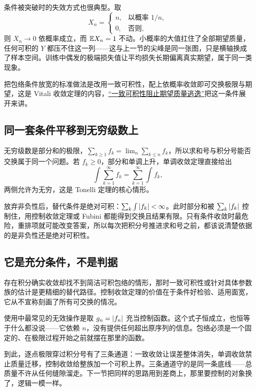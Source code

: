 条件被突破时的失效方式也很典型。取
\[
X_n=\begin{cases}
n,&\text{以概率 }1/n,\\
0,&\text{否则},
\end{cases}
\]
则 \(X_n\to0\) 依概率成立，而 \(\mathbb{E} X_n=1\) 不动。小概率的大值扛住了全部期望质量，任何可积的 \(Y\) 都压不住这一列——这与上一节的尖峰是同一张图，只是横轴换成了样本空间。训练中偶发的极端损失值让平均损失长期偏离真实期望，属于同一类现象。

把包络条件放宽的标准做法是改用一致可积性，配上依概率收敛即可交换极限与期望，这是 Vitali 收敛定理的内容，\hyperref[sec:12-Real-Analysis-Support/05-Measure-Integration-and-Conditional-Expectation/06]{``一致可积性阻止期望质量逃逸''}把这一条件展开来讲。

\subsection{同一套条件平移到无穷级数上}

无穷级数是部分和的极限，\(\sum_{k\ge1}f_k=\lim_n\sum_{k\le n}f_k\)，所以求和号与积分号能否交换属于同一个问题。若 \(f_k\ge0\)，部分和单调上升，单调收敛定理直接给出
\[
\int\sum_{k=1}^{\infty}f_k=\sum_{k=1}^{\infty}\int f_k,
\]
两侧允许为无穷，这是 Tonelli 定理的核心情形。

放弃非负性后，替代条件是绝对可积：\(\sum_k\int\left|f_k\right|<\infty\)。此时部分和被 \(\sum_k\left|f_k\right|\) 控制住，用控制收敛定理或 Fubini 都能得到交换且结果有限。只有条件收敛时最危险，重排项就可能改变答案，所以每次把积分号推进求和号之前，都该说清楚依据的是非负性还是绝对可积性。

\subsection{它是充分条件，不是判据}

存在积分确实收敛却找不到简洁可积包络的情形，那时一致可积性或针对具体参数族的估计是更精细的替代路径。控制收敛定理的价值在于条件好检验、适用面宽，它从不宣称刻画了所有可交换的情况。

使用中最常见的无效操作是取 \(g_n=\left|f_n\right|\) 充当控制函数。这个式子恒成立，也恒等于什么都没说——它依赖 \(n\)，没有提供任何超出原序列的信息。包络必须是一个固定的、在极限过程开始之前就摆在那里的函数。

到此，逐点极限穿过积分号有了三条通道：一致收敛让误差整体消失，单调收敛禁止质量迁移，控制收敛给整族加一个可积上界。三条通道守的是同一条底线——总质量不许从任何缝隙溜走。下一节把同样的思路用到差商上，那里要控制的对象换了，逻辑一模一样。
